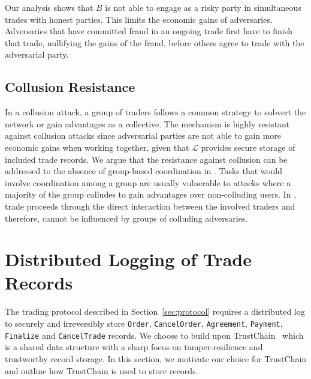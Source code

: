 Our analysis shows that $ B $ is not able to engage as a risky party in simultaneous trades with honest parties.
This limits the economic gains of adversaries.
Adversaries that have committed fraud in an ongoing trade first have to finish that trade, nullifying the gains of the fraud, before others agree to trade with the adversarial party.

\subsection{Collusion Resistance}
In a collusion attack, a group of traders follows a common strategy to subvert the network or gain advantages as a collective.
The \ModelName{} mechanism is highly resistant against collusion attacks since adversarial parties are not able to gain more economic gains when working together, given that $ \mathcal{L} $ provides secure storage of included trade records.
We argue that the resistance against collusion can be addressed to the absence of group-based coordination in \ModelName{}.
Tasks that would involve coordination among a group are usually vulnerable to attacks where a majority of the group colludes to gain advantages over non-colluding users.
In \ModelName{}, trade proceeds through the direct interaction between the involved traders and therefore, cannot be influenced by groups of colluding adversaries.

\section{Distributed Logging of Trade Records}
\label{sec:blockchain_accounting}
The \ModelName{} trading protocol described in Section~\ref{sec:protocol} requires a distributed log to securely and irreversibly store \texttt{Order}, \texttt{CancelOrder}, \texttt{Agreement}, \texttt{Payment}, \texttt{Finalize} and \texttt{CancelTrade} records.
We choose to build \ModelName{} upon TrustChain~\cite{otte2017trustchain} which is a shared data structure with a sharp focus on tamper-resilience and trustworthy record storage.
In this section, we motivate our choice for TrustChain and outline how TrustChain is used to store \ModelName{} records.

